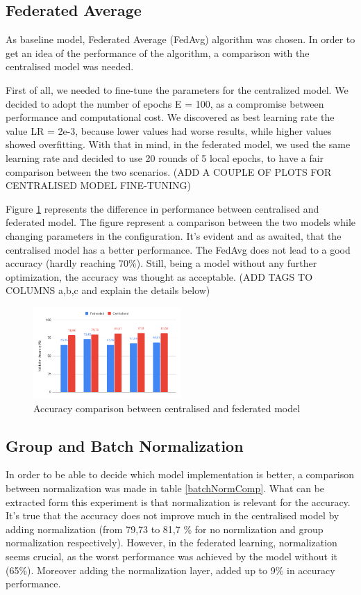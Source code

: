 \documentclass[twocolumn]{article}
\begin{document}
\subsection{Federated Average}
As baseline model, Federated Average (FedAvg) algorithm was chosen. In order to get an idea of the performance of the algorithm, a comparison with the centralised model was needed. 

First of all, we needed to fine-tune the parameters for the centralized model. We decided to adopt the number of epochs E = 100, as a compromise between performance and computational cost. We discovered as best learning rate the value LR = 2e-3, because lower values had worse results, while higher values showed overfitting. With that in mind, in the federated model, we used the same learning rate and decided to use 20 rounds of 5 local epochs, to have a fair comparison between the two scenarios.
(ADD A COUPLE OF PLOTS FOR CENTRALISED MODEL FINE-TUNING)

Figure \ref{AccCompFedCent} represents the difference in performance between centralised and federated model. The figure represent a comparison between the two models while changing parameters in the configuration. It's evident and as awaited, that the centralised model has a better performance. The FedAvg does not lead to a good accuracy (hardly reaching 70\%). Still, being a model without any further optimization, the accuracy was thought as acceptable. (ADD TAGS TO COLUMNS a,b,c and explain the details below)


\begin{figure}
    \centering
    \includegraphics[width=0.5\textwidth,height=.3\textheight]{FedAccuracyComp.png}
    \caption{Accuracy comparison between centralised and federated model}
     \label{AccCompFedCent} 
\end{figure}
\subsection{Group and Batch Normalization}
In order to be able to decide which model implementation is better, a comparison between normalization was made in table \ref{batchNormComp}. What can be extracted form this experiment is that normalization is relevant for the accuracy. It's true that the accuracy does not improve much in the centralised model by adding normalization (from 79,73 to 81,7 \% for no normlization and group normalization respectively). However, in the federated learning, normalization seems crucial, as the worst performance was achieved by the model without it (65\%). Moreover adding the normalization layer, added up to 9\% in accuracy performance. 
\end{document}
